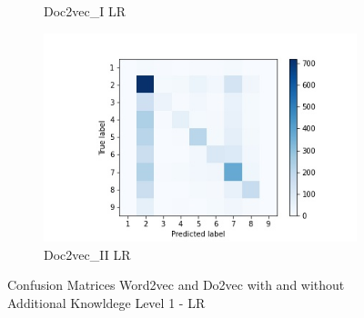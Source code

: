 \documentclass[12pt, a4paper, titlepage]{article}
\begin{document}
\begin{figure}[hb!]
\begin{subfigure}[b]{0.475\textwidth}
    {{\small Doc2vec\_I LR}}    
\end{subfigure}
\hfill
\begin{subfigure}[b]{0.475\textwidth}   
  \centering 
  \includegraphics[width=\textwidth]{cm_doc2vec_with_LR.jpg}
  {{\small Doc2vec\_II LR}}    
\end{subfigure}
\caption{\label{fig: F23} Confusion Matrices Word2vec and Do2vec with and without Additional Knowldege Level 1 - LR}
\end{figure}
\end{document}
